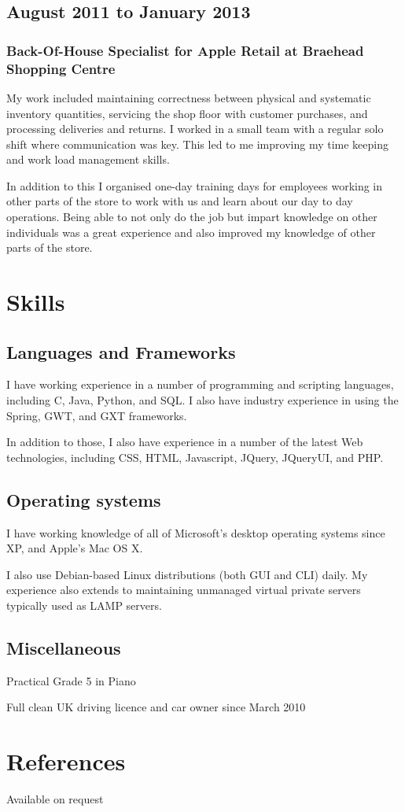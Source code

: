 \documentclass[11pt,a4paper]{article}
\begin{document}
\subsection*{August 2011 to January 2013}

\subsubsection*{Back-Of-House Specialist for Apple Retail at Braehead
Shopping Centre}

My work included maintaining correctness between physical and systematic
inventory quantities, servicing the shop floor with customer purchases, and
processing deliveries and returns. I worked in a small team with a regular
solo shift where communication was key. This led to me improving my time
keeping and work load management skills.

In addition to this I organised one-day training days for employees working in
other parts of the store to work with us and learn about our day to day
operations. Being able to not only do the job but impart knowledge on other
individuals was a great experience and also improved my knowledge of other
parts of the store.

\section*{Skills}

\subsection*{Languages and Frameworks}

I have working experience in a number of programming and scripting languages,
including C, Java, Python, and SQL. I also have industry experience in using
the Spring, GWT, and GXT frameworks.

In addition to those, I also have experience in a number of the latest Web
technologies, including CSS, HTML, Javascript, JQuery, JQueryUI, and PHP.

\subsection*{Operating systems}

I have working knowledge of all of Microsoft's desktop operating systems since
XP, and Apple's Mac OS X.

I also use Debian-based Linux distributions (both GUI and CLI) daily. My
experience also extends to maintaining unmanaged virtual private servers
typically used as LAMP servers.

\subsection*{Miscellaneous}

Practical Grade 5 in Piano

Full clean UK driving licence and car owner since March 2010

\section*{References}

Available on request

\end{document}
